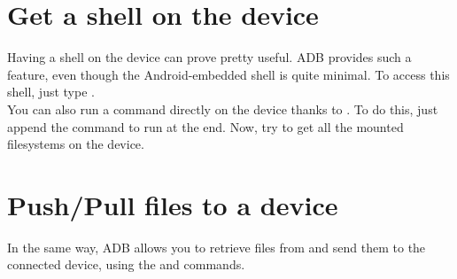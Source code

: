 \section{Get a shell on the device}

Having a shell on the device can prove pretty useful. ADB provides such a feature,
even though the Android-embedded shell is quite minimal. To access this shell,
just type .\\

You can also run a command directly on the device thanks to . To do
this, just append the command to run at the end. Now, try to get all the mounted
filesystems on the device.

\section{Push/Pull files to a device}

In the same way, ADB allows you to retrieve files from and send them to the
connected device, using the  and  commands. 

